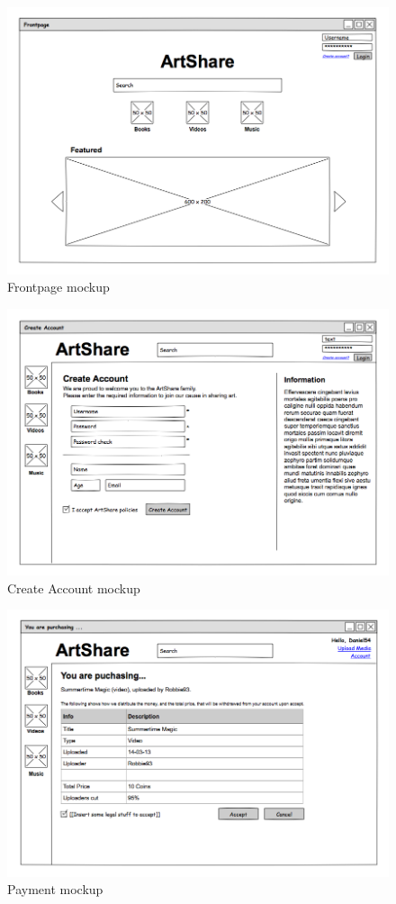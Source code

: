 \documentclass[../report.tex]{subfiles}
\begin{document}
\graphicspath{{img/}{../img/}}


\begin{figure}[H]
\centering
\includegraphics[scale=0.4]{mockups/frontpage.png}
\caption{Frontpage mockup}
\end{figure}

\begin{figure}[H]
\centering
\includegraphics[scale=0.4]{mockups/createaccount.png}
\caption{Create Account mockup}
\end{figure}

\begin{figure}[H]
\centering
\includegraphics[scale=0.4]{mockups/payment.png}
\caption{Payment mockup}
\end{figure}
\end{document}
